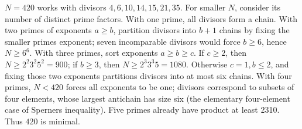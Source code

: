 $N=420$ works with divisors $4,6,10,14,15,21,35$. For smaller $N$, consider its number of distinct prime factors. With one prime, all divisors form a chain. With two primes of exponents $a\ge b$, partition divisors into $b+1$ chains by fixing the smaller prime\textquotesingle s exponent; seven incomparable divisors would force $b\ge6$, hence $N\ge6^6$. With three primes, sort exponents $a\ge b\ge c$. If $c\ge2$, then $N\ge2^2 3^2 5^2=900$; if $b\ge3$, then $N\ge2^3 3^3 5=1080$. Otherwise $c=1,b\le2$, and fixing those two exponents partitions divisors into at most six chains. With four primes, $N<420$ forces all exponents to be one; divisors correspond to subsets of four elements, whose largest antichain has size six (the elementary four-element case of Sperner\textquotesingle s inequality). Five primes already have product at least 2310. Thus $\boxed{420}$ is minimal.

